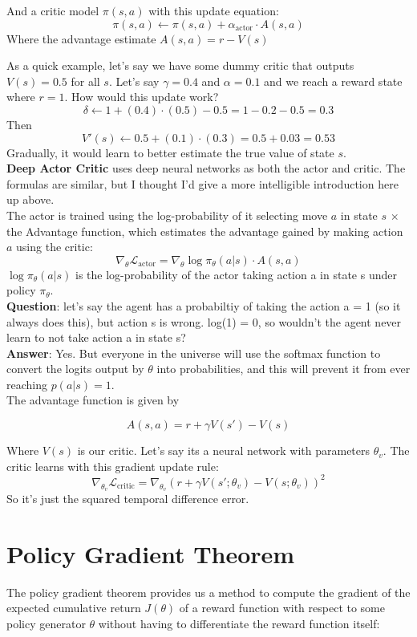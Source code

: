 \documentclass[12pt]{article}
\begin{document}
And a critic model \(\pi(s,a)\) with this update equation:
\[\pi(s,a) \leftarrow \pi(s,a) + \alpha_\text{actor}\cdot A(s,a)\]
Where the advantage estimate \(A(s,a) = r -V(s)\) 

As a quick example, let's say we have some dummy critic that outputs \(V(s)=0.5\) for all \(s\). Let's say \(\gamma=0.4\) and \(\alpha=0.1\) and we reach a reward state where \(r=1\). How would this update work?
\[\delta \leftarrow 1 + (0.4)\cdot(0.5) - 0.5 =1 - 0.2 - 0.5 = 0.3\]
Then 
\[V'(s) \leftarrow 0.5 + (0.1)\cdot(0.3) = 0.5 + 0.03 = 0.53\]
Gradually, it would learn to better estimate the true value of state \(s\).\\

\textbf{Deep Actor Critic} uses deep neural networks as both the actor and critic. The formulas are similar, but I thought I'd give a more intelligible introduction here up above. \\

The actor is  trained using the log-probability of it selecting move \(a\) in state \(s\) \(\times\) the Advantage function, which estimates the advantage gained by making action \(a\) using the critic:
\[\nabla_\theta \mathcal{L}_\text{actor} = \nabla_\theta \log \pi_\theta(a|s) \cdot A(s,a)\]
\(\log \pi_\theta(a|s)\) is the log-probability of the actor taking action a in state s under policy \(\pi_\theta\). \\

\textbf{Question}:  let's say the agent has a probabiltiy of taking the action a = 1 (so it always does this), but action s is wrong. log(1) = 0, so wouldn't the agent never learn to not take action a in state s?\\

\textbf{Answer}: Yes. But everyone in the universe will use the softmax function to convert the logits output by \(\theta\) into probabilities, and this will prevent it from ever reaching \(p(a|s) = 1\).\\

The advantage function is given by 

\[A(s,a) = r + \gamma V(s') - V(s)\]

Where \(V(s)\) is our critic. Let's say its a neural network with parameters \(\theta_v\). The critic learns with this gradient update rule:
\[\nabla_{\theta_v}\mathcal{L}_\text{critic} = \nabla_{\theta_v}(r + \gamma V(s'; \theta_v) - V(s; \theta_v))^2\]
So it's just the squared temporal difference error.

\section{Policy Gradient Theorem}
The policy gradient theorem provides us a method to compute the gradient of the expected cumulative return \(J(\theta)\) of a reward function with respect to some policy generator \(\theta\) without having to differentiate the reward function itself:\\ 
\end{document}
